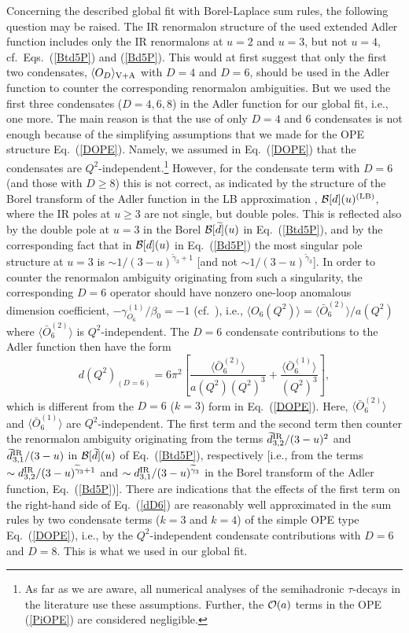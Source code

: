 \documentclass[aps,nofootinbib,showkeys,noshowpacs,preprintnumbers,amsmath,amssymb]{revtex4}
\def\be{\begin{equation}}
\def\ee{\end{equation}}
\newcommand{\td}{{\widetilde d}}
\newcommand{\tg}{{\widetilde {\gamma}}}
\begin{document}
Concerning the described global fit with Borel-Laplace sum rules, the following question may be raised. The IR renormalon structure of the used extended Adler function includes only the IR renormalons at $u=2$ and $u=3$, but not $u=4$, cf.~Eqs.~(\ref{Btd5P}) and (\ref{Bd5P}). This would at first suggest that only the first two condensates, $\langle O_D \rangle_{\rm V+A}$ with $D=4$ and $D=6$, should be used in the Adler function to counter the corresponding renormalon ambiguities. But we used the first three condensates ($D=4,6,8$) in the Adler function for our global fit, i.e., one more. The main reason is that the use of only $D=4$ and $6$ condensates is not enough because of the simplifying assumptions that we made for the OPE structure Eq.~(\ref{DOPE}). Namely, we assumed in Eq.~(\ref{DOPE}) that the condensates are $Q^2$-independent.\footnote{As far as we are aware, all numerical analyses of the semihadronic $\tau$-decays in the literature use these assumptions. Further, the ${\cal O}(a)$ terms in the OPE (\ref{PiOPE}) are considered negligible.} However, for the condensate term with $D=6$ (and those with $D \geq 8$) this is not correct, as indicated by the structure of the Borel transform of the Adler function in the LB approximation \cite{LB1,LB2,ren}, ${\cal B}[d](u)^{\rm (LB)}$, where the IR poles at $u \geq 3$ are not single, but double poles. This is reflected also by the double pole at $u=3$ in the Borel ${\cal B}[\td](u)$ in Eq.~(\ref{Btd5P}), and by the corresponding fact that in ${\cal B}[d](u)$ in Eq.~(\ref{Bd5P}) the most singular pole structure at $u=3$ is $\sim 1/(3 - u)^{\tg_3+1}$ [and not $\sim 1/(3-u)^{\tg_3}$]. In order to counter the renormalon ambiguity originating from such a singularity, the corresponding $D=6$ operator should have nonzero one-loop anomalous dimension coefficient, $-\gamma^{(1)}_{O_6}/\beta_0=-1$ (cf.~\cite{Btes,ren,renmod}), i.e., $\langle O_6(Q^2) \rangle = \langle {\bar O}^{(2)}_6 \rangle/a(Q^2)$ where $\langle {\bar O}^{(2)}_6 \rangle$ is $Q^2$-independent. The $D=6$ condensate contributions to the Adler function then have the form
\be
d(Q^2)_{(D=6)} = 6 \pi^2 \left[ \frac{\langle {\bar O}^{(2)}_6 \rangle}{a(Q^2) (Q^2)^3} + \frac{\langle {\bar O}^{(1)}_6 \rangle}{(Q^2)^3} \right],
\label{dD6} \ee
which is different from the $D=6$ ($k=3$) form in Eq.~(\ref{DOPE}). Here, $\langle {\bar O}^{(2)}_6 \rangle$ and $\langle {\bar O}^{(1)}_6 \rangle$ are $Q^2$-independent. The first term and the second term then counter the renormalon ambiguity originating from the terms $\td^{\rm IR}_{3,2}/(3 - u)^2$ and $\td^{\rm IR}_{3,1}/(3-u)$ in ${\cal B}[\td](u)$ of Eq.~(\ref{Btd5P}), respectively [i.e., from the terms $\sim d^{\rm IR}_{3,2}/(3 - u)^{\tg_3+1}$ and $\sim d^{\rm IR}_{3,1}/(3 - u)^{\tg_3}$ in the Borel transform of the Adler function, Eq.~(\ref{Bd5P})]. There are indications that the effects of the first term on the right-hand side of Eq.~(\ref{dD6}) are reasonably well approximated in the sum rules by two condensate terms ($k=3$ and $k=4$) of the simple OPE type Eq.~(\ref{DOPE}), i.e., by the $Q^2$-independent condensate contributions with $D=6$ and $D=8$. This is what we used in our global fit.
\end{document}
